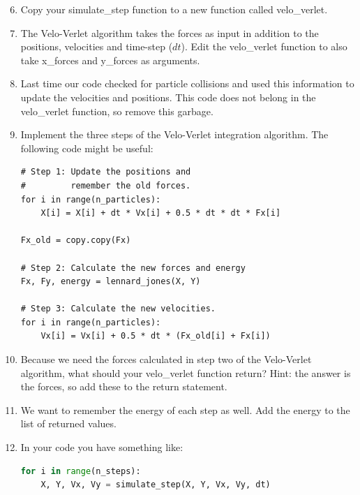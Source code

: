 \documentclass{article}
\begin{document}
\begin{enumerate}
    \setcounter{enumi}{5}
    \item Copy your simulate\_step function to a new function called velo\_verlet.
    \item The Velo-Verlet algorithm takes the forces as input in
        addition to the positions, velocities and time-step ($dt$). Edit the
        velo\_verlet function to also take x\_forces and y\_forces as arguments.

    \item Last time our code checked for particle collisions and used this
        information to update the velocities and positions. This code does not
        belong in the velo\_verlet function, so remove this garbage.

    \newpage

    \item Implement the three steps of the Velo-Verlet integration algorithm.
        The following code might be useful:

\begin{lstlisting}
# Step 1: Update the positions and
#         remember the old forces.
for i in range(n_particles):
    X[i] = X[i] + dt * Vx[i] + 0.5 * dt * dt * Fx[i]

Fx_old = copy.copy(Fx)

# Step 2: Calculate the new forces and energy
Fx, Fy, energy = lennard_jones(X, Y)

# Step 3: Calculate the new velocities.
for i in range(n_particles):
    Vx[i] = Vx[i] + 0.5 * dt * (Fx_old[i] + Fx[i])

\end{lstlisting}

    \item Because we need the forces calculated in step two of the Velo-Verlet
        algorithm, what should your velo\_verlet function return? Hint: the
        answer is the forces, so add these to the return statement.

    \item We want to remember the energy of each step as well. Add the energy
        to the list of returned values.

    \item In your code you have something like:

\begin{lstlisting}[language=python]
for i in range(n_steps):
    X, Y, Vx, Vy = simulate_step(X, Y, Vx, Vy, dt)
\end{lstlisting}


\end{enumerate}
\end{document}
